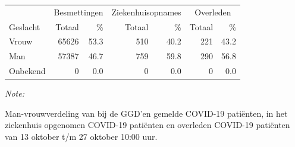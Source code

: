 \documentclass[
  english,
  man,floatsintext]{apa6}
\begin{document}
\begin{table}[H]
\centering\begingroup\fontsize{11}{13}\selectfont

\begin{threeparttable}
\begin{tabular}{lrrrrrr}
\toprule
\multicolumn{1}{c}{ } & \multicolumn{2}{c}{Besmettingen} & \multicolumn{2}{c}{Ziekenhuisopnames} & \multicolumn{2}{c}{Overleden} \\
\cmidrule(l{3pt}r{3pt}){2-3} \cmidrule(l{3pt}r{3pt}){4-5} \cmidrule(l{3pt}r{3pt}){6-7}
Geslacht & Totaal & \% & Totaal & \% & Totaal & \%\\
\midrule
Vrouw & 65626 & 53.3 & 510 & 40.2 & 221 & 43.2\\
Man & 57387 & 46.7 & 759 & 59.8 & 290 & 56.8\\
Onbekend & 0 & 0.0 & 0 & 0.0 & 0 & 0.0\\
\bottomrule
\end{tabular}
\begin{tablenotes}
\item \textit{Note: } 
\item Man-vrouwverdeling van bij de GGD’en gemelde COVID-19 patiënten, in het ziekenhuis opgenomen COVID-19 patiënten en overleden COVID-19 patiënten van 13 oktober t/m 27 oktober 10:00 uur.
\end{tablenotes}
\end{threeparttable}
\endgroup{}
\end{table}
\newpage
\end{document}
